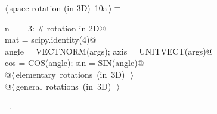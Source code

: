 \documentclass[11pt,oneside]{article}	%
\begin{document}
\begin{flushleft} \small \label{scrap23}
\protect{}$\langle\,$space rotation (in 3D)\nobreak\ {\footnotesize 10a}$\,\rangle\equiv$
\vspace{-1ex}
\begin{list}{}{} \item
\mbox{}\verb@if n == 3: # rotation in 2D@\\
\mbox{}\verb@   mat = scipy.identity(4)@\\
\mbox{}\verb@   angle = VECTNORM(args); axis = UNITVECT(args)@\\
\mbox{}\verb@   cos = COS(angle); sin = SIN(angle)@\\
\mbox{}\verb@   @\hbox{$\langle\,$elementary rotations (in 3D)\nobreak\ {\footnotesize {}}$\,\rangle$}\verb@@\\
\mbox{}\verb@   @\hbox{$\langle\,$general rotations (in 3D)\nobreak\ {\footnotesize {}}$\,\rangle$}\verb@@\\
\mbox{}\verb@@{\NWsep}
\end{list}
\vspace{-1ex}
\footnotesize\addtolength{\baselineskip}{-1ex}
\begin{list}{}{\setlength{\itemsep}{-\parsep}\setlength{\itemindent}{-\leftmargin}}
\item \NWtxtMacroRefIn\ .
\end{list}
\end{flushleft}
\end{document}
